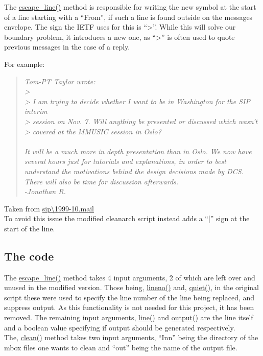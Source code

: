\documentclass[a4paper,english]{report}
\begin{document}
The \url{escape_line()} method is responsible for writing the new symbol at the start of a line starting with a “From”, if such a line is found outside on the messages envelope. The sign the IETF uses for this is “>”. While this will solve our boundary problem, it introduces a new one, as “>” is often used to quote previous messages in the case of a reply.

For example:
\begin{quotation}


\textit{
\noindent
Tom-PT Taylor wrote:\\
> \\
> I am trying to decide whether I want to be in Washington for the SIP interim\\
> session on Nov. 7.  Will anything be presented or discussed which wasn't\\
> covered at the MMUSIC session in Oslo?\\\\
\noindent
It will be a much more in depth presentation than in Oslo. We now have
several hours just for tutorials and explanations, in order to best
understand the motivations behind the design decisions made by DCS.
There will also be time for discussion afterwards.\\
\noindent
-Jonathan R.}
\end{quotation}

Taken from  \url{sip\1999-10.mail}\\

To avoid this issue the modified cleanarch script instead adds a “|” sign at the start of the line.\\


\subsection{The code}

The \url{escape_line()} method takes 4 input arguments, 2 of which are left over and unused in the modified version.  Those being, \url{lineno()} and, \url{quiet()}, in the original script these were used to specify the line number of the line being replaced, and suppress output. As this functionality is not needed for this project, it has been removed. The remaining input arguments, \url{line()} and \url{output()} are the line itself and a boolean value specifying if output should be generated respectively. \\

The, \url{clean()} method takes two input arguments, “Inn” being the directory of the mbox files one wants to clean and “out” being the name of the output file.
\end{document}
